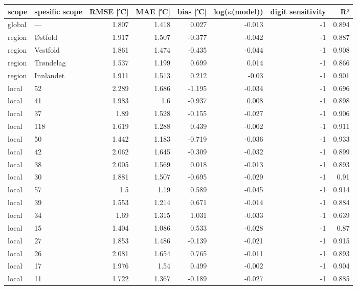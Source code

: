 \begin{tabular}{llrrrrrr}
\hline
 scope   & spesific
scope           &       RMSE
[℃] &   MAE [℃] &        bias
[℃] &   log($\kappa$(model)) &    digit
sensitivity &    R² \\
\hline
 global  & ---       & 1.807 &     1.418 &  0.027 &                 -0.013 & -1 & 0.894 \\
 region  & Østfold   & 1.917 &     1.507 & -0.377 &                 -0.042 & -1 & 0.887 \\
 region  & Vestfold  & 1.861 &     1.474 & -0.435 &                 -0.044 & -1 & 0.908 \\
 region  & Trøndelag & 1.537 &     1.199 &  0.699 &                  0.014 & -1 & 0.866 \\
 region  & Innlandet & 1.911 &     1.513 &  0.212 &                 -0.03  & -1 & 0.901 \\
 local   & 52        & 2.289 &     1.686 & -1.195 &                 -0.034 & -1 & 0.696 \\
 local   & 41        & 1.983 &     1.6   & -0.937 &                  0.008 & -1 & 0.898 \\
 local   & 37        & 1.89  &     1.528 & -0.155 &                 -0.027 & -1 & 0.906 \\
 local   & 118       & 1.619 &     1.288 &  0.439 &                 -0.002 & -1 & 0.911 \\
 local   & 50        & 1.442 &     1.183 & -0.719 &                 -0.036 & -1 & 0.933 \\
 local   & 42        & 2.062 &     1.645 & -0.309 &                 -0.032 & -1 & 0.899 \\
 local   & 38        & 2.005 &     1.569 &  0.018 &                 -0.013 & -1 & 0.893 \\
 local   & 30        & 1.881 &     1.507 & -0.695 &                 -0.029 & -1 & 0.91  \\
 local   & 57        & 1.5   &     1.19  &  0.589 &                 -0.045 & -1 & 0.914 \\
 local   & 39        & 1.553 &     1.214 &  0.671 &                 -0.014 & -1 & 0.884 \\
 local   & 34        & 1.69  &     1.315 &  1.031 &                 -0.033 & -1 & 0.639 \\
 local   & 15        & 1.404 &     1.086 &  0.533 &                 -0.028 & -1 & 0.87  \\
 local   & 27        & 1.853 &     1.486 & -0.139 &                 -0.021 & -1 & 0.915 \\
 local   & 26        & 2.081 &     1.654 &  0.765 &                 -0.011 & -1 & 0.893 \\
 local   & 17        & 1.976 &     1.54  &  0.499 &                 -0.002 & -1 & 0.904 \\
 local   & 11        & 1.722 &     1.367 & -0.189 &                 -0.027 & -1 & 0.885 \\
\hline
\end{tabular}